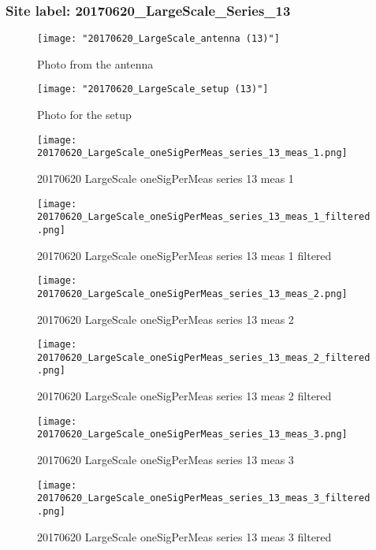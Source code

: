 \subsubsection{Site label: 20170620\_LargeScale\_Series\_13}
\begin{figure}[ht] \caption{Photo from the antenna}
\texttt{[image: "20170620\_LargeScale\_antenna (13)"]}\centering\end{figure}
\begin{figure}[ht] \caption{Photo for the setup}
\texttt{[image: "20170620\_LargeScale\_setup (13)"]}\centering\end{figure}
\begin{figure}[ht] \caption{20170620 LargeScale oneSigPerMeas series 13 meas 1}
\texttt{[image: 20170620\_LargeScale\_oneSigPerMeas\_series\_13\_meas\_1.png]}\centering\end{figure}
\begin{figure}[ht] \caption{20170620 LargeScale oneSigPerMeas series 13 meas 1 filtered}
\texttt{[image: 20170620\_LargeScale\_oneSigPerMeas\_series\_13\_meas\_1\_filtered.png]}\centering\end{figure}
\begin{figure}[ht] \caption{20170620 LargeScale oneSigPerMeas series 13 meas 2}
\texttt{[image: 20170620\_LargeScale\_oneSigPerMeas\_series\_13\_meas\_2.png]}\centering\end{figure}
\begin{figure}[ht] \caption{20170620 LargeScale oneSigPerMeas series 13 meas 2 filtered}
\texttt{[image: 20170620\_LargeScale\_oneSigPerMeas\_series\_13\_meas\_2\_filtered.png]}\centering\end{figure}
\begin{figure}[ht] \caption{20170620 LargeScale oneSigPerMeas series 13 meas 3}
\texttt{[image: 20170620\_LargeScale\_oneSigPerMeas\_series\_13\_meas\_3.png]}\centering\end{figure}
\begin{figure}[ht] \caption{20170620 LargeScale oneSigPerMeas series 13 meas 3 filtered}
\texttt{[image: 20170620\_LargeScale\_oneSigPerMeas\_series\_13\_meas\_3\_filtered.png]}\centering\end{figure}
\clearpage
